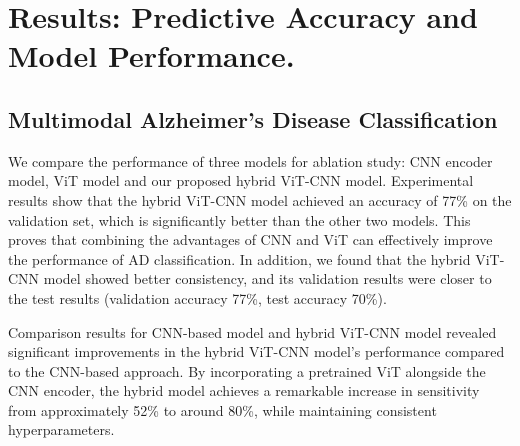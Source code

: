 \section{Results: Predictive Accuracy and Model Performance.}
\label{sec:results}
\subsection{Multimodal Alzheimer's Disease Classification}


We compare the performance of three models for ablation study: CNN encoder model, ViT model and our proposed hybrid ViT-CNN model. Experimental results show that the hybrid ViT-CNN model achieved an accuracy of 77\% on the validation set, which is significantly better than the other two models. This proves that combining the advantages of CNN and ViT can effectively improve the performance of AD classification. In addition, we found that the hybrid ViT-CNN model showed better consistency, and its validation results were closer to the test results (validation accuracy 77\%, test accuracy 70\%). 

Comparison results for CNN-based model and hybrid ViT-CNN model revealed significant improvements in the hybrid ViT-CNN model's performance compared to the CNN-based approach. By incorporating a pretrained ViT alongside the CNN encoder, the hybrid model achieves a remarkable increase in sensitivity from approximately 52\% to around 80\%, while maintaining consistent hyperparameters. 
    
    

